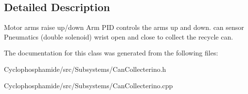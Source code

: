 \subsection{Detailed Description}
Motor arms raise up/down Arm P\+I\+D controls the arms up and down. can sensor Pneumatics (double solenoid) wrist open and close to collect the recycle can. 

The documentation for this class was generated from the following files\+:\begin{DoxyCompactItemize}
\item 
Cyclophosphamide/src/\+Subsystems/Can\+Collecterino.\+h\item 
Cyclophosphamide/src/\+Subsystems/Can\+Collecterino.\+cpp\end{DoxyCompactItemize}
